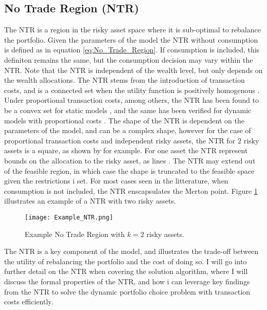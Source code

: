 \documentclass[11pt]{article}
\begin{document}
\subsection{No Trade Region (NTR)} \label{Subsection: No-trade-region}
The \ac{NTR} is a region in the risky asset space where
it is sub-optimal to rebalance the portfolio.
Given the parameters of the model the \ac{NTR} without consumption is defined as in equation \eqref{eq:No_Trade_Region}.
If consumption is included, this definiton remains the same, but the consumption decision may vary within the \ac{NTR}.
Note that the \ac{NTR} is independent of the wealth level, but only depends on the wealth allocations.
The \ac{NTR} stems from the introduction of transaction costs, and is a connected set when the utility function is positively homogenous \autocite{Abrams1980}.
Under proportional transaction costs, among others, the \ac{NTR} has been found to be a convex set for static models \autocite{Dybvig2020},
and the same has been verified for dynamic models with proportional costs \autocite{CaiJuddXu2013}.
The shape of the \ac{NTR} is dependent on the parameters of the model, and can be a complex shape,
however for the case of proportional transaction costs and independent risky assets, the \ac{NTR} for $2$ risky assets
is a square, as shown by \textcite{Aikan1996} for example. For one asset the \ac{NTR} represent bounds on the allocation to the risky asset, as lines \autocite{DavisNorman1990}.
The NTR may extend out of the feasible region, in which case the shape is truncated to the feasible space given the restrictions i set.
For most cases seen in the litterature, when consumption is not included, the \ac{NTR} enscapsulates the Merton point.
Figure \ref{fig: NTR_Example} illustrates an example of a \ac{NTR} with two risky assets.
\begin{figure}[h!]
  \begin{center}
  \caption{Example No Trade Region with $k=2$ risky assets.} 
  \label{fig: NTR_Example}
  \texttt{[image: Example\_NTR.png]}
  \end{center}
\end{figure}
The \ac{NTR} is a key component of the model, and illustrates the trade-off between the utility of rebalancing the portfolio and the cost of doing so.
I will go into further detail on the \ac{NTR} when covering the solution algorithm, where I will discuss the formal properties of the \ac{NTR},
and how i can leverage key findings from the \ac{NTR} to solve the dynamic portfolio choice problem with transaction costs efficiently.
\end{document}
